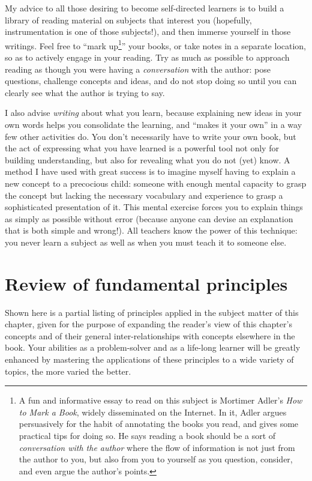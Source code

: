 My advice to all those desiring to become self-directed learners is to build a library of reading material on subjects that interest you (hopefully, instrumentation is one of those subjects!), and then immerse yourself in those writings.  Feel free to ``mark up\footnote{A fun and informative essay to read on this subject is Mortimer Adler's \textit{How to Mark a Book}, widely disseminated on the Internet.  In it, Adler argues persuasively for the habit of annotating the books you read, and gives some practical tips for doing so.  He says reading a book should be a sort of \textit{conversation with the author} where the flow of information is not just from the author to you, but also from you to yourself as you question, consider, and even argue the author's points.}'' your books, or take notes in a separate location, so as to actively engage in your reading.  Try as much as possible to approach reading as though you were having a \textit{conversation} with the author: pose questions, challenge concepts and ideas, and do not stop doing so until you can clearly see what the author is trying to say.

I also advise \textit{writing} about what you learn, because explaining new ideas in your own words helps you consolidate the learning, and ``makes it your own'' in a way few other activities do.  You don't necessarily have to write your own book, but the act of expressing what you have learned is a powerful tool not only for building understanding, but also for revealing what you do not (yet) know.  A method I have used with great success is to imagine myself having to explain a new concept to a precocious child: someone with enough mental capacity to grasp the concept but lacking the necessary vocabulary and experience to grasp a sophisticated presentation of it.  This mental exercise forces you to explain things as simply as possible without error (because anyone can devise an explanation that is both simple and wrong!).  All teachers know the power of this technique: you never learn a subject as well as when you must teach it to someone else.









\filbreak
\section{Review of fundamental principles}

Shown here is a partial listing of principles applied in the subject matter of this chapter, given for the purpose of expanding the reader's view of this chapter's concepts and of their general inter-relationships with concepts elsewhere in the book.  Your abilities as a problem-solver and as a life-long learner will be greatly enhanced by mastering the applications of these principles to a wide variety of topics, the more varied the better.

